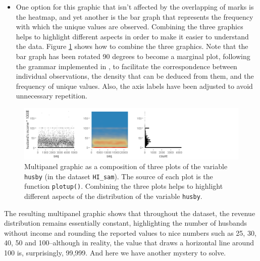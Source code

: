 \begin{itemize}
	\tightlist
	\item
	One option for this graphic that isn't affected by the overlapping of
	marks is the heatmap, and yet another is the bar graph that represents
	the frequency with which the unique values are observed. Combining the
	three graphics helps to highlight different aspects in order to make
	it easier to understand the data. Figure \ref{fig:lastone} shows how
	to combine the three graphics. Note that the bar graph has been
	rotated 90 degrees to become a marginal plot, following the grammar
	implemented in , to facilitate the correspondence between
	individual observations, the density that can be deduced from them,
	and the frequency of unique values. Also, the axis labels have been
	adjusted to avoid unnecessary repetition.
\end{itemize}

	
\begin{Schunk}
\begin{figure}[H]
\includegraphics[width=1\linewidth]{figures/lastone-1} \caption[Multipanel graphic as a composition of plotup outputs]{Multipanel graphic as a composition of three plots of the variable \texttt{husby} (in the dataset \texttt{HI\_sam}). The source of each plot is the function \texttt{plotup()}. Combining the three plots helps to highlight different aspects of the distribution of the variable \texttt{husby}.}\label{fig:lastone}
\end{figure}
\end{Schunk}

The resulting multipanel graphic shows that throughout the dataset, the
revenue distribution remains essentially constant, highlighting the
number of husbands without income and rounding the reported values to
nice numbers such as 25, 30, 40, 50 and 100--although in reality, the
value that draws a horizontal line around 100 is, surprisingly, 99,999.
And here we have another mystery to solve.

